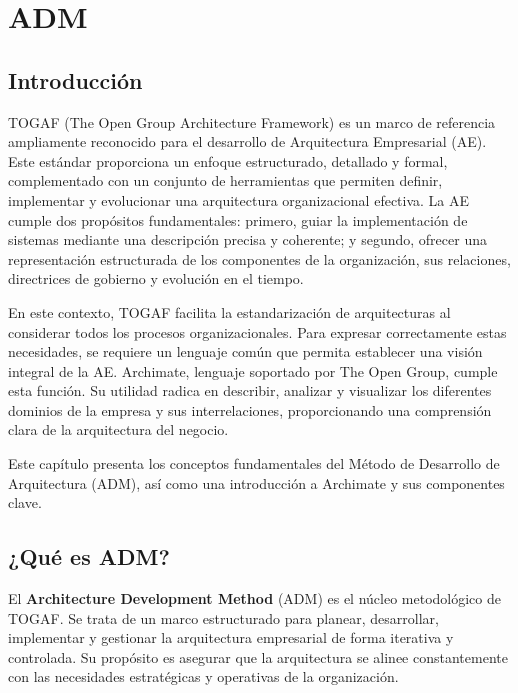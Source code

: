 \graphicspath{{./1-Proyecto/capitulo1/}}

\chapter{ADM}

\section{Introducción}
TOGAF (The Open Group Architecture Framework) es un marco de referencia ampliamente reconocido para el desarrollo de Arquitectura Empresarial (AE). Este estándar proporciona un enfoque estructurado, detallado y formal, complementado con un conjunto de herramientas que permiten definir, implementar y evolucionar una arquitectura organizacional efectiva. La AE cumple dos propósitos fundamentales: primero, guiar la implementación de sistemas mediante una descripción precisa y coherente; y segundo, ofrecer una representación estructurada de los componentes de la organización, sus relaciones, directrices de gobierno y evolución en el tiempo. \cite{why_is_important_ADM}

En este contexto, TOGAF facilita la estandarización de arquitecturas al considerar todos los procesos organizacionales. Para expresar correctamente estas necesidades, se requiere un lenguaje común que permita establecer una visión integral de la AE. Archimate, lenguaje soportado por The Open Group, cumple esta función. Su utilidad radica en describir, analizar y visualizar los diferentes dominios de la empresa y sus interrelaciones, proporcionando una comprensión clara de la arquitectura del negocio. \cite{definicion_puntos_de_vista}

Este capítulo presenta los conceptos fundamentales del Método de Desarrollo de Arquitectura (ADM), así como una introducción a Archimate y sus componentes clave.

\section{¿Qué es ADM?}
El \textbf{Architecture Development Method} (ADM) es el núcleo metodológico de TOGAF. Se trata de un marco estructurado para planear, desarrollar, implementar y gestionar la arquitectura empresarial de forma iterativa y controlada. Su propósito es asegurar que la arquitectura se alinee constantemente con las necesidades estratégicas y operativas de la organización. \cite{ADM_definition}

